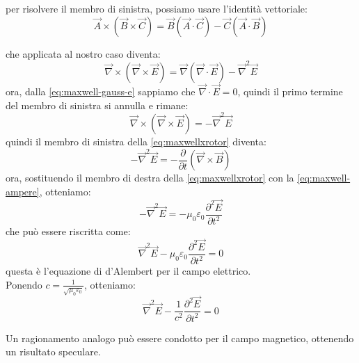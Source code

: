 per risolvere il membro di sinistra, possiamo usare l'identità vettoriale:
\begin{equation}    
    \vec{A} \times (\vec{B} \times \vec{C}) = \vec{B} (\vec{A} \cdot \vec{C}) - \vec{C} (\vec{A} \cdot \vec{B})
\end{equation}

che applicata al nostro caso diventa:
\begin{equation}
    \vec{\nabla} \times (\vec{\nabla} \times \vec{E}) = \vec{\nabla} (\vec{\nabla} \cdot \vec{E}) - \vec{\nabla}^2 \vec{E}
\end{equation}
ora, dalla \eqref{eq:maxwell-gauss-e} sappiamo che $\vec{\nabla} \cdot \vec{E} = 0$, quindi il primo termine del membro di 
sinistra si annulla e rimane:  
\begin{equation}
    \vec{\nabla} \times (\vec{\nabla} \times \vec{E}) = - \vec{\nabla}^2 \vec{E}
\end{equation}
quindi il membro di sinistra della \eqref{eq:maxwellxrotor} diventa:
\begin{equation}
    - \vec{\nabla}^2 \vec{E} = -\frac{\partial}{\partial t} (\vec{\nabla} \times \vec{B})   
\end{equation}
ora, sostituendo il membro di destra della \eqref{eq:maxwellxrotor} con la \eqref{eq:maxwell-ampere}, otteniamo:
\begin{equation}
    - \vec{\nabla}^2 \vec{E} = -\mu_0 \varepsilon_0 \frac{\partial^2 \vec{E}}{\partial t^2}
\end{equation}
che può essere riscritta come:
\begin{equation}
    \vec{\nabla}^2 \vec{E} - \mu_0 \varepsilon_0 \frac{\partial^2 \vec{E}}{\partial t^2} = 0
\end{equation}
questa è l'equazione di d'Alembert per il campo elettrico.\\ 
Ponendo $c = \frac{1}{\sqrt{\mu_0 \varepsilon_0}}$, otteniamo:
\begin{equation}
    \vec{\nabla}^2 \vec{E} - \frac{1}{c^2} \frac{\partial^2 \vec{E}}{\partial t^2} = 0  
\end{equation}

Un ragionamento analogo può essere condotto per il campo magnetico, ottenendo un risultato speculare.